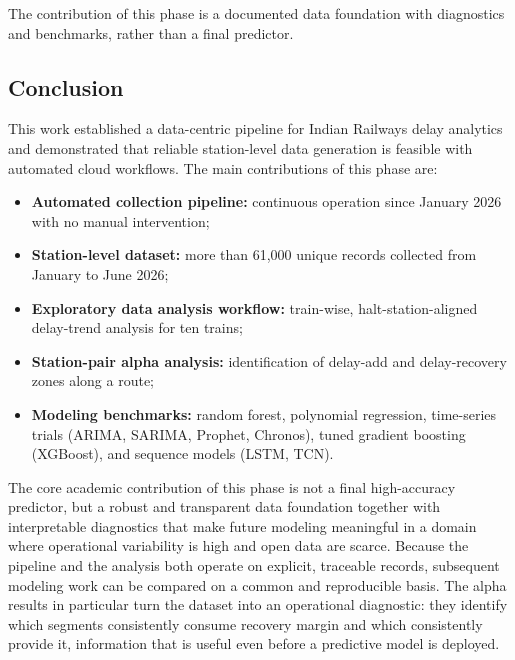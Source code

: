 \documentclass[a4paper,fleqn]{cas-dc}
\begin{document}
The contribution of this phase is a documented data foundation with
diagnostics and benchmarks, rather than a final predictor.

\subsection{Conclusion}
This work established a data-centric pipeline for Indian Railways delay
analytics and demonstrated that reliable station-level data generation is
feasible with automated cloud workflows. The main contributions of this
phase are:
\begin{itemize}
    \item \textbf{Automated collection pipeline:} continuous operation
          since January 2026 with no manual intervention;
    \item \textbf{Station-level dataset:} more than 61{,}000 unique records
          collected from January to June 2026;
    \item \textbf{Exploratory data analysis workflow:} train-wise,
          halt-station-aligned delay-trend analysis for ten trains;
    \item \textbf{Station-pair alpha analysis:} identification of
          delay-add and delay-recovery zones along a route;
    \item \textbf{Modeling benchmarks:} random forest, polynomial
          regression, time-series trials (ARIMA, SARIMA, Prophet, Chronos),
          tuned gradient boosting (XGBoost), and sequence models (LSTM, TCN).
\end{itemize}
The core academic contribution of this phase is not a final high-accuracy
predictor, but a robust and transparent data foundation together with
interpretable diagnostics that make future modeling meaningful in a domain
where operational variability is high and open data are scarce. Because the
pipeline and the analysis both operate on explicit, traceable records,
subsequent modeling work can be compared on a common and reproducible basis.
The alpha results in particular turn the dataset into an operational
diagnostic: they identify which segments consistently consume recovery margin
and which consistently provide it, information that is useful even before a
predictive model is deployed.
\end{document}

